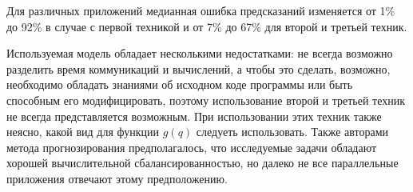 
		Для различных приложений медианная ошибка предсказаний изменяется от 1\% до 92\% в случае с первой техникой и от 7\% до 67\% для второй и третьей техник.

		Используемая модель обладает несколькими недостатками: не всегда возможно разделить время коммуникаций и вычислений, а чтобы это сделать, возможно, необходимо обладать знаниями об исходном коде программы или быть способным его модифицировать, поэтому использование второй и третьей техник не всегда представляется возможным. При использовании этих техник также неясно, какой вид для функции \(g(q)\) следуеть использовать. Также авторами метода прогнозирования предполагалось, что исследуемые задачи обладают хорошей вычислительной сбалансированностью, но далеко не все параллельные приложения отвечают этому предположению.

